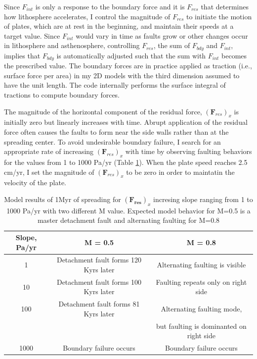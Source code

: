 \documentclass[letterpaper,12pt,notitle]{memphisthesis}                     %
\begin{document}
Since $F_{int}$ is only a response to the boundary force and it is $F_{res}$ that determines how lithosphere accelerates, I control the magnitude of $F_{res}$ to initiate the motion of plates, which are at rest in the beginning, and maintain their speeds at a target value. Since $F_{int}$ would vary in time as faults grow or other changes occur in lithosphere and asthenosphere, controlling $F_{res}$, the sum of $F_{bdy}$ and $F_{int}$, implies that $F_{bdy}$ is automatically adjusted such that the sum with $F_{int}$ becomes the prescribed value. The boundary forces are in practice applied as traction (i.e., surface force per area) in my 2D models with the third dimension assumed to have the unit length. The code internally performs the surface integral of tractions to compute boundary forces.

The magnitude of the horizontal component of the residual force, $(\boldsymbol{F}_{res})_{x}$ is initially zero but linearly increases with time. Abrupt application of the residual force often causes the faults to form near the side walls rather than at the spreading center.
To avoid undesirable boundary failure, I search for an appropriate rate of increasing $(\boldsymbol{F}_{res})_{x}$ with time by observing faulting behaviors for the values from 1 to 1000 Pa/yr (Table \ref{tab:slope}). When the plate speed reaches 2.5 cm/yr, I set the magnitude of $(\boldsymbol{F}_{res})_{x}$ to be zero in order to maintatin the velocity of the plate.
%
\begin{table}[h!]
	\centering
	\caption{Model results of 1Myr of spreading for $(\boldsymbol{F_{res}})_x$ incresing slope ranging from 1 to 1000 Pa/yr with two different M value. Expected model behavior for M=0.5 is a master detachment fault and alternating faulting for M=0.8}
	\label{tab:slope}
	\begin{tabular}{ccc}
		\toprule
		Slope, Pa/yr & M = 0.5 & M = 0.8\\
		\midrule
          	1 & Detachment fault forms 120 Kyrs later & Alternating faulting is visible\\
		10 & Detachment fault forms 100 Kyrs later & Faulting repeats only on right side\\
		100 & Detachment fault forms 81 Kyrs later & Alternating faulting mode, \\
		&&but faulting is dominanted on right side\\
		1000 & Boundary failure occurs & Boundary failure occurs\\
		\bottomrule
	\end{tabular}
\end{table}
%
\end{document}
